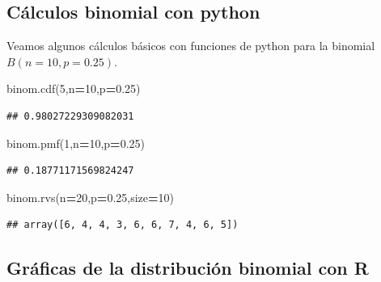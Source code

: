 \documentclass[]{book}
\newenvironment{Shaded}{\begin{snugshade}}{\end{snugshade}}
\newcommand{\DecValTok}[1]{\textcolor[rgb]{0.00,0.00,0.81}{#1}}
\newcommand{\FloatTok}[1]{\textcolor[rgb]{0.00,0.00,0.81}{#1}}
\newcommand{\NormalTok}[1]{#1}
\newcommand{\OperatorTok}[1]{\textcolor[rgb]{0.81,0.36,0.00}{\textbf{#1}}}
\begin{document}
\hypertarget{cuxe1lculos-binomial-con-python}{%
\subsection{Cálculos binomial con python}\label{cuxe1lculos-binomial-con-python}}

Veamos algunos cálculos básicos con funciones de python para la binomial \(B(n=10,p=0.25)\).

\begin{Shaded}
\begin{Highlighting}[]
\NormalTok{binom.cdf(}\DecValTok{5}\NormalTok{,n}\OperatorTok{=}\DecValTok{10}\NormalTok{,p}\OperatorTok{=}\FloatTok{0.25}\NormalTok{)}
\end{Highlighting}
\end{Shaded}

\begin{verbatim}
## 0.98027229309082031
\end{verbatim}

\begin{Shaded}
\begin{Highlighting}[]
\NormalTok{binom.pmf(}\DecValTok{1}\NormalTok{,n}\OperatorTok{=}\DecValTok{10}\NormalTok{,p}\OperatorTok{=}\FloatTok{0.25}\NormalTok{)}
\end{Highlighting}
\end{Shaded}

\begin{verbatim}
## 0.18771171569824247
\end{verbatim}

\begin{Shaded}
\begin{Highlighting}[]
\NormalTok{binom.rvs(n}\OperatorTok{=}\DecValTok{20}\NormalTok{,p}\OperatorTok{=}\FloatTok{0.25}\NormalTok{,size}\OperatorTok{=}\DecValTok{10}\NormalTok{)}
\end{Highlighting}
\end{Shaded}

\begin{verbatim}
## array([6, 4, 4, 3, 6, 6, 7, 4, 6, 5])
\end{verbatim}

\hypertarget{gruxe1ficas-de-la-distribuciuxf3n-binomial-con-r}{%
\subsection{Gráficas de la distribución binomial con R}\label{gruxe1ficas-de-la-distribuciuxf3n-binomial-con-r}}
\end{document}
